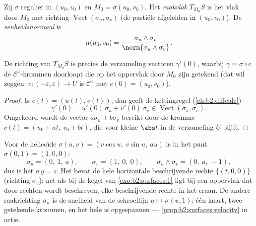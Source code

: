 \begin{definition}[Raakvlak]\label{def:b2:surfaces:tangent}
Zij $\sigma$ regulier in $(u_0, v_0)$ en $M_0 = \sigma(u_0, v_0)$.
Het \emph{raakvlak} $T_{M_0}S$ is het vlak door
$M_0$ met richting $\operatorname{Vect}(\sigma_u, \sigma_v)$ (de
partiële afgeleiden in $(u_0, v_0)$). De
\emph{eenheidsnormaal} is
\[
n(u_0, v_0)
= \frac{\sigma_u \wedge \sigma_v}
       {\norm{\sigma_u \wedge \sigma_v}} .
\]
\end{definition}

\begin{proposition}\label{prop:b2:surfaces:velocity}
De richting van $T_{M_0}S$ is precies de verzameling vectoren
$\gamma'(0)$, waarbij $\gamma = \sigma \circ c$ de
$\mathcal{C}^1$-krommen doorloopt die op het oppervlak door $M_0$
zijn getekend (dat wil zeggen: $c \colon (-\varepsilon,
\varepsilon) \to U$ is $\mathcal{C}^1$ met $c(0) = (u_0, v_0)$).
\end{proposition}

\begin{proof}
Is $c(t) = (u(t), v(t))$, dan geeft de kettingregel
(\cref{ch:b2:diffcalc})
\[
\gamma'(0) = u'(0)\,\sigma_u + v'(0)\,\sigma_v
\in \operatorname{Vect}(\sigma_u, \sigma_v).
\]
Omgekeerd wordt de vector $a\sigma_u + b\sigma_v$ bereikt door de
kromme $c(t) = (u_0 + at,\ v_0 + bt)$, die voor kleine $\abs t$ in
de  verzameling $U$ blijft.
\end{proof}

\begin{example}
\label{ex:b2:surfaces:helicoidtangent}
Voor de helicoïde $\sigma(u, v) = (v\cos u,\ v\sin u,\ au)$ is in
het punt $\sigma(0, 1) = (1, 0, 0)$:
\[
\sigma_u = (0,\ 1,\ a), \qquad \sigma_v = (1,\ 0,\ 0),
\qquad
\sigma_u \wedge \sigma_v = (0,\ a,\ -1),
\]
dus is het  $a\,y = z$. Het bevat de hele horizontale
beschrijvende rechte $\{(t, 0, 0)\}$ (richting $\sigma_v$): net als
bij de kegel van \cref{exo:b2:surfaces:1} ligt bij een oppervlak
dat door rechten wordt beschreven, elke beschrijvende rechte in het
 eraan. De andere raakrichting $\sigma_u$ is de snelheid
van de schroeflijn $u \mapsto \sigma(u, 1)$: één kaart, twee
getekende krommen, en het hele  is opgespannen ---
\cref{prop:b2:surfaces:velocity} in actie.
\end{example}

